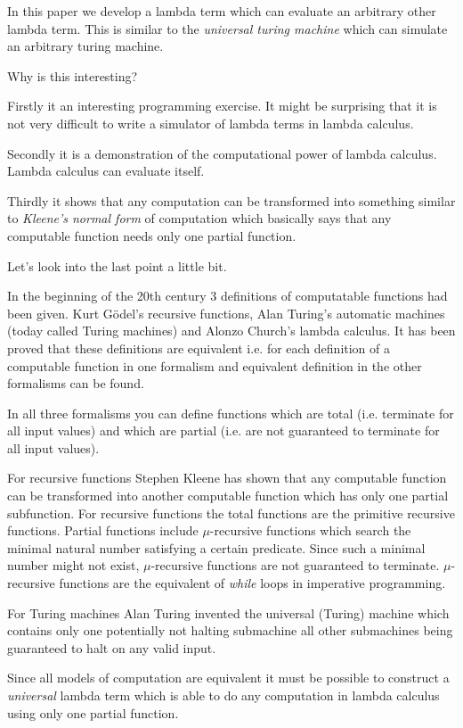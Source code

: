 \documentclass[12pt]{article}
\begin{document}
In this paper we develop a lambda term which can evaluate an arbitrary other
lambda term. This is similar to the \emph{universal turing machine} which can
simulate an arbitrary turing machine.

Why is this interesting?

Firstly it an interesting programming exercise. It might be surprising that it
is not very difficult to write a simulator of lambda terms in lambda calculus.

Secondly it is a demonstration of the computational power of lambda
calculus. Lambda calculus can evaluate itself.

Thirdly it shows that any computation can be transformed into something similar
to \emph{Kleene's normal form} of computation which basically says that any
computable function needs only one partial function.

Let's look into the last point a little bit.

In the beginning of the 20th century 3 definitions of computatable functions had
been given. Kurt Gödel's recursive functions, Alan Turing's automatic machines
(today called Turing machines) and Alonzo Church's lambda calculus. It has been
proved that these definitions are equivalent i.e. for each definition of a
computable function in one formalism and equivalent definition in the other
formalisms can be found.

In all three formalisms you can define functions which are total (i.e. terminate
for all input values) and which are partial (i.e. are not guaranteed to
terminate for all input values).

For recursive functions Stephen Kleene has shown that any computable function
can be transformed into another computable function which has only one partial
subfunction. For recursive functions the total functions are the primitive
recursive functions. Partial functions include $\mu$-recursive functions which
search the minimal natural number satisfying a certain predicate. Since such a
minimal number might not exist, $\mu$-recursive functions are not guaranteed to
terminate. $\mu$-recursive functions are the equivalent of \emph{while} loops in
imperative programming.

For Turing machines Alan Turing invented the universal (Turing) machine which
contains only one potentially not halting submachine all other submachines
being guaranteed to halt on any valid input.

Since all models of computation are equivalent it must be possible to construct
a \emph{universal} lambda term which is able to do any computation in lambda
calculus using only one partial function.
\end{document}
